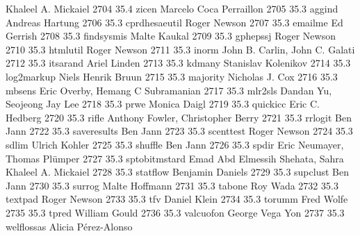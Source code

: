                                    Khaleel A. Mickaiel                     
  2704     35.4    zicen         Marcelo Coca Perraillon                 
  2705     35.3    aggind        Andreas Hartung                         
  2706     35.3    cprdhesaeutil  Roger Newson                            
  2707     35.3    emailme       Ed Gerrish                              
  2708     35.3    findsysmis    Malte Kaukal                            
  2709     35.3    gphepssj      Roger Newson                            
  2710     35.3    htmlutil      Roger Newson                            
  2711     35.3    inorm         John B. Carlin, John C. Galati          
  2712     35.3    itsarand      Ariel Linden                            
  2713     35.3    kdmany        Stanislav Kolenikov                     
  2714     35.3    log2markup    Niels Henrik Bruun                      
  2715     35.3    majority      Nicholas J. Cox                         
  2716     35.3    mbsens        Eric Overby, Hemang C Subramanian       
  2717     35.3    mlr2sls       Dandan Yu, Seojeong Jay Lee             
  2718     35.3    prwe          Monica Daigl                            
  2719     35.3    quickicc      Eric C. Hedberg                         
  2720     35.3    rifle         Anthony Fowler, Christopher Berry       
  2721     35.3    rrlogit       Ben Jann                                
  2722     35.3    saveresults   Ben Jann                                
  2723     35.3    scenttest     Roger Newson                            
  2724     35.3    sdlim         Ulrich Kohler                           
  2725     35.3    shuffle       Ben Jann                                
  2726     35.3    spdir         Eric Neumayer, Thomas Plümper          
  2727     35.3    sptobitmstard  Emad Abd Elmessih Shehata, Sahra        
                                   Khaleel A. Mickaiel                     
  2728     35.3    statflow      Benjamin Daniels                        
  2729     35.3    supclust      Ben Jann                                
  2730     35.3    surrog        Malte Hoffmann                          
  2731     35.3    tabone        Roy Wada                                
  2732     35.3    textpad       Roger Newson                            
  2733     35.3    tfv           Daniel Klein                            
  2734     35.3    torumm        Fred Wolfe                              
  2735     35.3    tpred         William Gould                           
  2736     35.3    valcuofon     George Vega Yon                         
  2737     35.3    welflossas    Alicia Pérez-Alonso                    
